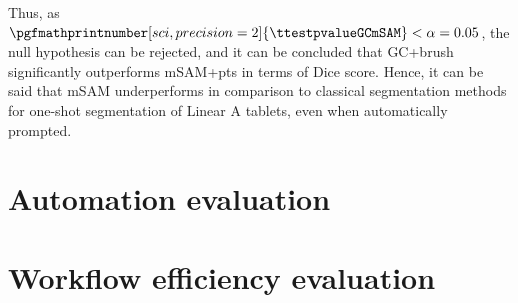 Thus, as $\pgfmathprintnumber[sci,precision=2]{\ttestpvalueGCmSAM} < \alpha = 0.05$, the null hypothesis can be rejected, and it can be concluded that \acs{GC+brush} significantly outperforms \acs{mSAM+pts} in terms of \acs{Dice} score.
Hence, it can be said that \acs{mSAM} underperforms in comparison to classical segmentation methods for one-shot segmentation of Linear A tablets, even when automatically prompted.

\section{Automation evaluation}
\section{Workflow efficiency evaluation}